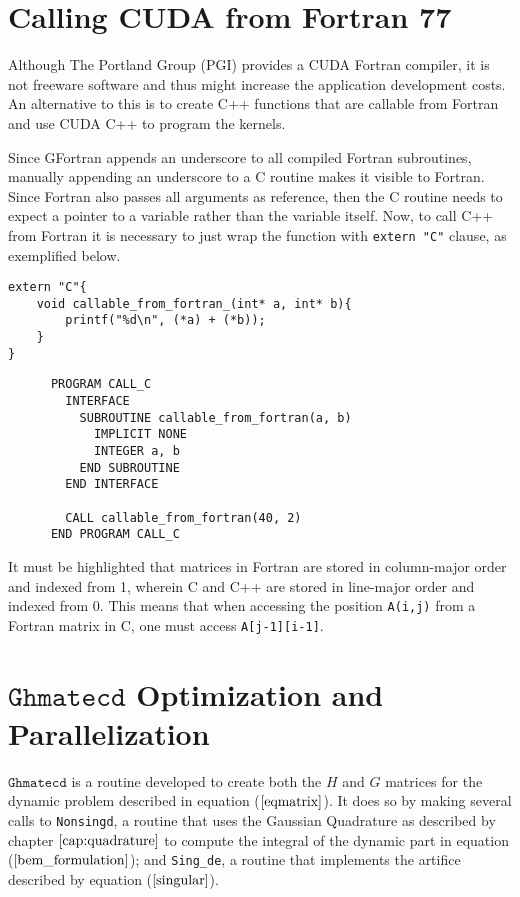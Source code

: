 \section{Calling CUDA from Fortran 77}

Although The Portland Group (PGI) provides a CUDA Fortran compiler, it is not freeware software 
and thus might increase the application development costs. An alternative to this is to 
create C++ functions that are callable from Fortran and use CUDA C++ to program the kernels.

Since GFortran appends an underscore to all compiled Fortran subroutines, manually appending an 
underscore to a C routine makes it visible to Fortran. Since Fortran also passes all arguments 
as reference, then the C routine needs to expect a pointer to a variable rather than the variable 
itself. Now, to call C++ from Fortran it is necessary to just wrap the function with \texttt{extern "C"}
clause, as exemplified below.

\begin{minipage}{\textwidth}
\lstset{language=C}
\begin{lstlisting}
extern "C"{
	void callable_from_fortran_(int* a, int* b){
		printf("%d\n", (*a) + (*b));
	}
}
\end{lstlisting}
\lstset{language=Fortran}
\begin{lstlisting}
      PROGRAM CALL_C
        INTERFACE
          SUBROUTINE callable_from_fortran(a, b)
            IMPLICIT NONE
            INTEGER a, b
          END SUBROUTINE
        END INTERFACE

        CALL callable_from_fortran(40, 2)
      END PROGRAM CALL_C
\end{lstlisting}
\end{minipage}
It must be highlighted that matrices in Fortran are stored in column-major order and indexed from 1, 
wherein C and C++ are stored in line-major order and indexed from 0. This means that when accessing 
the position \texttt{A(i,j)} from a Fortran matrix in C, one must access \texttt{A[j-1][i-1]}.

\section{$\texttt{Ghmatecd}$ Optimization and Parallelization}

$\texttt{Ghmatecd}$ is a routine developed to create both the $H$ and $G$ matrices for the dynamic problem 
described in equation ($\ref{eqmatrix}$). It does so by making several calls to \texttt{Nonsingd}, a routine
that uses the Gaussian Quadrature as described by chapter $\ref{cap:quadrature}$ to compute the integral of the 
dynamic part in equation ($\ref{bem_formulation}$); and \texttt{Sing\_de}, a routine 
that implements the artifice described by equation ($\ref{singular}$).

